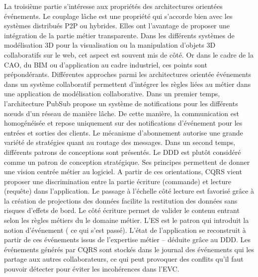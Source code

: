 La troisième partie s'intéresse aux propriétés des architectures orientées 
événements. Le couplage lâche est une propriété 
qui s'accorde bien avec les systèmes distribués \gls{P2P} ou hybrides. Elles ont 
l'avantage de proposer une intégration de la partie métier transparente. Dans les 
différents 
systèmes de modélisation 3D pour la visualisation ou la manipulation d'objets 3D 
collaboratifs sur le web, cet aspect est souvent mis de côté. Or dans le cadre de 
la \gls{CAO}, du \gls{BIM} ou d'application au cadre industriel, ces points sont 
prépondérants.
Différentes approches parmi les architectures orientée événements dans un 
système collaboratif permettent d'intégrer les règles liées au métier dans une 
application de modélisation collaborative. Dans un 
premier temps, l'architecture \gls{PubSub} propose un système de notifications 
pour les différents 
n\oe uds d'un réseau de manière lâche. De cette manière, la communication est 
homogénéisée et repose uniquement sur des notifications d'événement pour les 
entrées et sorties des clients. Le mécanisme d'abonnement autorise une 
grande variété de stratégies quant au routage des messages.
Dans un second temps, différents patrons de conceptions sont présentés. Le 
\gls{DDD} est plutôt considéré comme un patron de conception stratégique. Ses 
principes permettent de donner une vision centrée métier au logiciel. 
A partir de ces orientations, \gls{CQRS} vient proposer une discrimination entre la 
partie écriture (commande) et lecture (requête) dans l'application. Le passage à 
l'échelle côté lecture est favorisé grâce à la création de projections des données 
facilite la restitution des données sans risques d'effets de bord. 
Le côté écriture permet de valider le contenu entrant selon les règles métiers du 
le domaine métier. L'\gls{ES} est le patron qui introduit la notion d'événement (\og 
ce qui s'est passé\fg{}). L'état de l'application se reconstruit à 
partir de ces événements issus de l'expertise métier -- déduite grâce au \gls{DDD}. 
Les événements générés par \gls{CQRS} sont stockés dans le journal des 
événements qui les partage aux autres collaborateurs, ce qui peut 
provoquer des conflits qu'il faut pouvoir détecter pour éviter les incohérences dans 
l'\gls{EVC}. 

